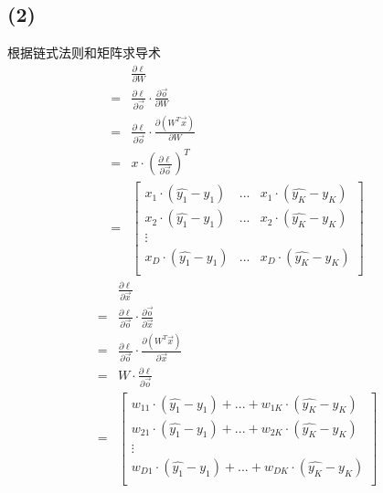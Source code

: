 \documentclass[12pt,a4paper]{article}
\begin{document}
\subsection*{(2)}
根据链式法则和矩阵求导术
\begin{align*}
      & \frac{\partial \ell}{\partial W}                                                     \\
    = & \frac{\partial \ell}{\partial \vec{o}}\cdot \frac{\partial \vec{o}}{\partial W}      \\
    = & \frac{\partial \ell}{\partial \vec{o}}\cdot \frac{\partial (W^T\vec{x})}{\partial W} \\
    = & x\cdot (\frac{\partial \ell}{\partial \vec{o}})^T                                    \\
    = &
    \begin{bmatrix}
        x_1\cdot (\hat{y_1} - y_1) & ... & x_1\cdot (\hat{y_K} - y_K) \\
        x_2\cdot (\hat{y_1} - y_1) & ... & x_2\cdot (\hat{y_K} - y_K) \\
        \vdots                                                        \\
        x_D\cdot (\hat{y_1} - y_1) & ... & x_D\cdot (\hat{y_K} - y_K) \\
    \end{bmatrix}
\end{align*}
\begin{align*}
      & \frac{\partial \ell}{\partial \vec{x}}                                                     \\
    = & \frac{\partial \ell}{\partial \vec{o}}\cdot \frac{\partial \vec{o}}{\partial \vec{x}}      \\
    = & \frac{\partial \ell}{\partial \vec{o}}\cdot \frac{\partial (W^T\vec{x})}{\partial \vec{x}} \\
    = & W \cdot \frac{\partial \ell}{\partial \vec{o}}                                             \\
    = &
    \begin{bmatrix}
        w_{11}\cdot (\hat{y_1} - y_1) + ... + w_{1K}\cdot (\hat{y_K} - y_K) \\
        w_{21}\cdot (\hat{y_1} - y_1) + ... + w_{2K}\cdot (\hat{y_K} - y_K) \\
        \vdots                                                              \\
        w_{D1}\cdot (\hat{y_1} - y_1) + ... + w_{DK}\cdot (\hat{y_K} - y_K) \\
    \end{bmatrix}
\end{align*}
\end{document}
